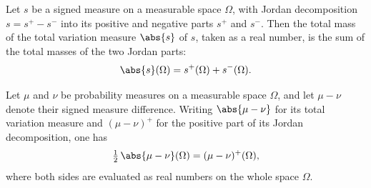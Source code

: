 \begin{lemma}
\label{CommunicationComplexity.TVDistance.totalVariation_real_univ}
\leanok
{}
Let $s$ be a signed measure on a measurable space $\Omega$, with Jordan decomposition $s
= s^+ - s^-$ into its positive and negative parts $s^+$ and $s^-$. Then the total mass
of the total variation measure $\abs{s}$ of $s$, taken as a real number, is the sum of
the total masses of the two Jordan parts:
\[
\abs{s}(\Omega) = s^+(\Omega) + s^-(\Omega).
\]
\end{lemma}

\begin{lemma}
\label{CommunicationComplexity.TVDistance.half_totalVariation_real_univ_eq_posPart_real_univ}
\leanok
{}
Let $\mu$ and $\nu$ be probability measures on a measurable space $\Omega$, and let
$\mu-\nu$ denote their signed measure difference. Writing $\abs{\mu-\nu}$ for its total
variation measure and $(\mu-\nu)^{+}$ for the positive part of its Jordan decomposition,
one has
\[
\tfrac{1}{2}\,\abs{\mu-\nu}(\Omega) = (\mu-\nu)^{+}(\Omega),
\]
where both sides are evaluated as real numbers on the whole space $\Omega$.
\end{lemma}

